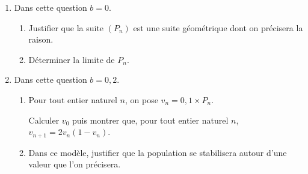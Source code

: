 \medskip

\begin{enumerate}
\item Dans cette question $b  = 0$.
	\begin{enumerate}
		\item Justifier que la suite $\left(P_n\right)$ est une suite géométrique dont on précisera la raison.
		\item Déterminer la limite de $P_n$.
	\end{enumerate}
\item Dans cette question $b = 0,2$.
	\begin{enumerate}
		\item Pour tout entier naturel $n$, on pose $v_n = 0,1 \times P_n$.

Calculer $v_0$ puis montrer que, pour tout entier naturel $n$,\:$v_{n+1} = 2v_n\left(1 - v_n \right)$.
		\item Dans ce modèle, justifier que la population se stabilisera autour d'une valeur que l'on précisera.
	\end{enumerate}
\end{enumerate}

